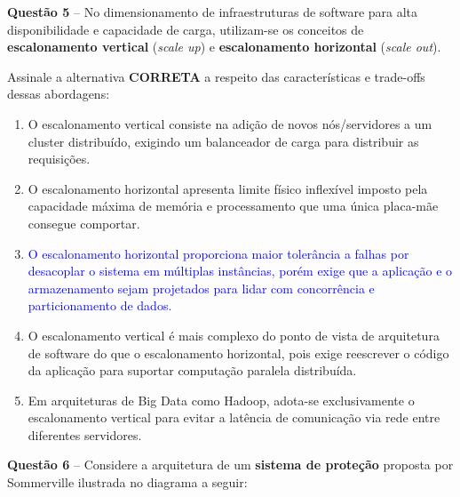 \documentclass[12pt,a4paper]{article}
\begin{document}
\vspace{0.5cm}

\textbf{Questão 5} -- No dimensionamento de infraestruturas de software para alta disponibilidade e capacidade de carga, utilizam-se os conceitos de \textbf{escalonamento vertical} (\textit{scale up}) e \textbf{escalonamento horizontal} (\textit{scale out}).

\vspace{0.2cm}

Assinale a alternativa \textbf{CORRETA} a respeito das características e trade-offs dessas abordagens:

\vspace{0.3cm}

\begin{enumerate}[label=\textbf{(\Alph*)}]
    \item O escalonamento vertical consiste na adição de novos nós/servidores a um cluster distribuído, exigindo um balanceador de carga para distribuir as requisições.

    \item O escalonamento horizontal apresenta limite físico inflexível imposto pela capacidade máxima de memória e processamento que uma única placa-mãe consegue comportar.

    \item[\textcolor{blue}{\textbf{(C)}}] \textcolor{blue}{O escalonamento horizontal proporciona maior tolerância a falhas por desacoplar o sistema em múltiplas instâncias, porém exige que a aplicação e o armazenamento sejam projetados para lidar com concorrência e particionamento de dados.}

    \item O escalonamento vertical é mais complexo do ponto de vista de arquitetura de software do que o escalonamento horizontal, pois exige reescrever o código da aplicação para suportar computação paralela distribuída.

    \item Em arquiteturas de Big Data como Hadoop, adota-se exclusivamente o escalonamento vertical para evitar a latência de comunicação via rede entre diferentes servidores.
\end{enumerate}

\vspace{0.5cm}

\textbf{Questão 6} -- Considere a arquitetura de um \textbf{sistema de proteção} proposta por Sommerville ilustrada no diagrama a seguir:
\end{document}
